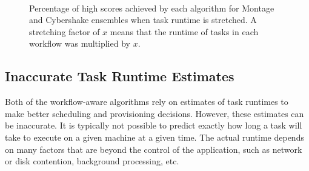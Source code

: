 \documentclass[conference]{IEEEtran}
\begin{document}
\begin{figure}[p]
    \centering
    \\
    \caption[Percentage of high scores achieved by each algorithm for Montage and Cybershake ensembles when task runtime is stretched]{Percentage of high scores achieved by each algorithm for Montage and Cybershake ensembles when task runtime is stretched. A stretching factor of $x$ means that the runtime of tasks in each workflow was multiplied by $x$.}
    \label{fig:stretching}
\end{figure}


\subsection{Inaccurate Task Runtime Estimates}
\label{sec:variances}

Both of the workflow-aware algorithms rely on estimates of task runtimes to make better scheduling and provisioning decisions. However, these estimates can be inaccurate. It is typically not possible to predict exactly how long a task will take to execute on a given machine at a given time. The actual runtime depends on many factors that are beyond the control of the application, such as network or disk contention, background processing, etc.
\end{document}
